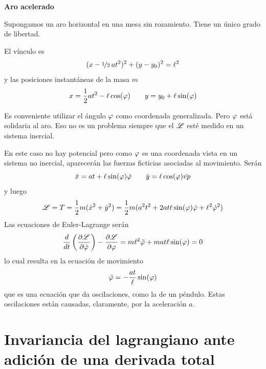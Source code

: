 \documentclass[10pt,oneside]{CBFT_book}
\begin{document}
\begin{ejemplo}{\bfseries Aro acelerado }


Supongamos un aro horizontal en una mesa sin rozamiento. Tiene un único grado de libertad.

El vínculo es
\[
	(x - \nicefrac{1}{2} \: at^2)^2 + (y-y_0 )^2 = \ell^2
\]
y las posiciones instantáneas de la masa $ m $
\[
	x = \frac{1}{2}at^2 - \ell \cos(\varphi) \qquad  y = y_0 + \ell \sin(\varphi)
\]

Es conveniente utilizar el ángulo $\varphi$ como coordenada generalizada. Pero $\varphi$ está solidaria al aro.
Eso no es un problema siempre que el $\mathscr{L}$ esté medido en un sistema inercial.

En este caso no hay potencial pero como $\varphi$ es una coordenada vista en un sistema no inercial, aparecerán
las fuerzas ficticias asociadas al movimiento.
Serán
\[
	\dot{x} = at + \ell \sin(\varphi) \dot{\varphi} \qquad \dot{y} = \ell \cos(\varphi) \dot{vp}
\]
y luego 
\[
	\mathscr{L} = T = \frac{1}{2} m (\dot{x}^2 + \dot{y}^2 ) = \frac{1}{2} m
	(a^2 t^2 + 2at\ell\sin(\varphi)\dot{\varphi}+\ell^2\dot{\varphi}^2)
\]
Las ecuaciones de Euler-Lagrange serán 
\[
	\frac{d^{\hspace{-0.05em}} {}}{d {t}^{\hspace{-0.05em}}}\left( \frac{\partial^{\hspace{-0.05em}} {\mathscr{L}}}{\partial {\dot{\varphi}}^{\hspace{-0.05em}}}\right) - \frac{\partial^{\hspace{-0.05em}} {\mathscr{L}}}{\partial {\varphi}^{\hspace{-0.05em}}} = 
	m \ell^2 \ddot{\varphi} + mat\ell \sin(\varphi) = 0
\]
lo cual resulta en la ecuación de movimiento
\[
	\ddot{\varphi} = - \frac{at}{\ell} \sin(\varphi) 
\]
que es una ecuación que da oscilaciones, como la de un péndulo. Estas oscilaciones están causadas, claramente,
por la aceleración $a$.



\end{ejemplo}

\section{Invariancia del lagrangiano ante adición de una derivada total}
\end{document}
